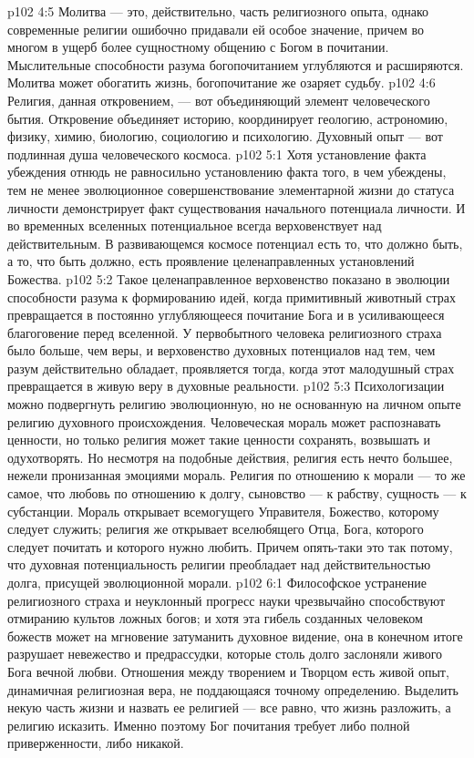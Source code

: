 \vs p102 4:5 \pc Молитва --- это, действительно, часть религиозного опыта, однако современные религии ошибочно придавали ей особое значение, причем во многом в ущерб более сущностному общению с Богом в почитании. Мыслительные способности разума богопочитанием углубляются и расширяются. Молитва может обогатить жизнь, богопочитание же озаряет судьбу.
\vs p102 4:6 \pc Религия, данная откровением, --- вот объединяющий элемент человеческого бытия. Откровение объединяет историю, координирует геологию, астрономию, физику, химию, биологию, социологию и психологию. Духовный опыт --- вот подлинная душа человеческого космоса.
\vs p102 5:1 Хотя установление факта убеждения отнюдь не равносильно установлению факта того, в чем убеждены, тем не менее эволюционное совершенствование элементарной жизни до статуса личности демонстрирует факт существования начального потенциала личности. И во временных вселенных потенциальное всегда верховенствует над действительным. В развивающемся космосе потенциал есть то, что должно быть, а то, что быть должно, есть проявление целенаправленных установлений Божества.
\vs p102 5:2 Такое целенаправленное верховенство показано в эволюции способности разума к формированию идей, когда примитивный животный страх превращается в постоянно углубляющееся почитание Бога и в усиливающееся благоговение перед вселенной. У первобытного человека религиозного страха было больше, чем веры, и верховенство духовных потенциалов над тем, чем разум действительно обладает, проявляется тогда, когда этот малодушный страх превращается в живую веру в духовные реальности.
\vs p102 5:3 Психологизации можно подвергнуть религию эволюционную, но не основанную на личном опыте религию духовного происхождения. Человеческая мораль может распознавать ценности, но только религия может такие ценности сохранять, возвышать и одухотворять. Но несмотря на подобные действия, религия есть нечто большее, нежели пронизанная эмоциями мораль. Религия по отношению к морали --- то же самое, что любовь по отношению к долгу, сыновство --- к рабству, сущность --- к субстанции. Мораль открывает всемогущего Управителя, Божество, которому следует служить; религия же открывает вселюбящего Отца, Бога, которого следует почитать и которого нужно любить. Причем опять\hyp{}таки это так потому, что духовная потенциальность религии преобладает над действительностью долга, присущей эволюционной морали.
\vs p102 6:1 Философское устранение религиозного страха и неуклонный прогресс науки чрезвычайно способствуют отмиранию культов ложных богов; и хотя эта гибель созданных человеком божеств может на мгновение затуманить духовное видение, она в конечном итоге разрушает невежество и предрассудки, которые столь долго заслоняли живого Бога вечной любви. Отношения между творением и Творцом есть живой опыт, динамичная религиозная вера, не поддающаяся точному определению. Выделить некую часть жизни и назвать ее религией --- все равно, что жизнь разложить, а религию исказить. Именно поэтому Бог почитания требует либо полной приверженности, либо никакой.
